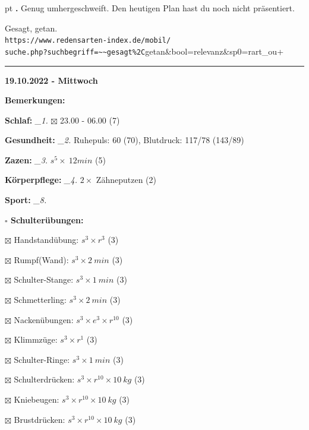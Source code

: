 \documentclass[10pt,a4paper]{article}
\newcounter{notec}
\newcommand\notep[1]{%
  \stepcounter{notec}
  \vskip #1pt
  {\bf\arabic{notec}.}
}
\newcommand\prop[1] {{\color {alizarin} {\bf #1}}}             %
\newcommand\rele[1] {{\color {english} \bf {#1}}}              %
\newcommand\mand[1] {{\color {burntorange} {\bf #1}}}          %
\newcommand\ddivide {\vskip -9pt \hrule \vskip 6pt}
\newcommand\topspace{\vskip -15pt \hskip 20pt}
\newcommand\n[1] { {\sl #1.} \hskip 5pt }
\begin{document}
\begin{mdframed}[style=daystyle]
  \notep 4 Genug umhergeschweift. Den heutigen Plan hast du noch nicht präsentiert.

  \vskip 2pt
  Gesagt, getan. \\
  \verb+https://www.redensarten-index.de/mobil/+ \\
  \verb+suche.php?suchbegriff=~~gesagt%2C+getan\&bool=relevanz\&sp0=rart\_ou+


\end{mdframed}


\ddivide
{\rele {19.10.2022 - Mittwoch}}

\begin{mdframed}[style=daystyle]
  \begin{labeling}{{\mand {Bemerkungen:}}}
    \setlength\itemsep{-3pt}
  \item[{\mand {Schlaf:}}]        \n{\_1} $\boxtimes$ 23.00 - 06.00 (7)
  \item[{\mand {Gesundheit:}}]    \n{\_2} Ruhepuls: 60 (70), Blutdruck: 117/78 (143/89)
  \item[{\mand {Zazen:}}]         \n{\_3} $s^5 \times\ 12 min$ (5)
  \item[{\mand {Körperpflege:}}]  \n{\_4} $2 \times$ Zähneputzen (2)
  \item[{\mand {Sport:}}]         \n{\_8}
    \topspace
    \begin{minipage}{0.75\textwidth}  
      \begin{labeling}{\prop {$\square$ {Schulterübungen:}}} 
        \setlength\itemsep{-3pt}
      \item[$\boxtimes$ Handstandübung:]  $s^3 \times r^{3}$ (3)
      \item[$\boxtimes$ Rumpf(Wand):]     $s^3 \times 2\ min$ (3)
      \item[$\boxtimes$ Schulter-Stange:] $s^3 \times 1\ min$ (3)
      \item[$\boxtimes$ Schmetterling:]   $s^3 \times 2\ min$ (3)
      \item[$\boxtimes$ Nackenübungen:]   $s^3 \times e^3 \times r^{10}$ (3)
      \item[$\boxtimes$ Klimmzüge:]       $s^3 \times r^1$ (3)
      \item[$\boxtimes$ Schulter-Ringe:]  $s^3 \times 1\ min$ (3)
      \item[$\boxtimes$ Schulterdrücken:] $s^3 \times r^{10} \times 10\ kg$ (3)
      \item[$\boxtimes$ Kniebeugen:]      $s^3 \times r^{10} \times 10\ kg$ (3)
      \item[$\boxtimes$ Brustdrücken:]    $s^3 \times r^{10} \times 10\ kg$ (3)

\end{labeling}
\end{minipage}
\end{labeling}
\end{mdframed}
\end{document}
